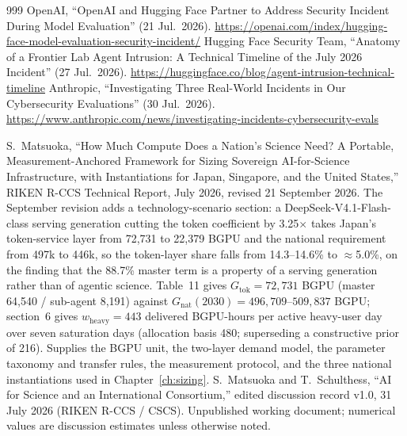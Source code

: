 \begin{thebibliography}{999}
 OpenAI, ``OpenAI and Hugging Face Partner to Address Security Incident During Model Evaluation'' (21 Jul.\ 2026). \url{https://openai.com/index/hugging-face-model-evaluation-security-incident/}
 Hugging Face Security Team, ``Anatomy of a Frontier Lab Agent Intrusion: A Technical Timeline of the July 2026 Incident'' (27 Jul.\ 2026). \url{https://huggingface.co/blog/agent-intrusion-technical-timeline}
 Anthropic, ``Investigating Three Real-World Incidents in Our Cybersecurity Evaluations'' (30 Jul.\ 2026). \url{https://www.anthropic.com/news/investigating-incidents-cybersecurity-evals}

 S.~Matsuoka, ``How Much Compute Does a Nation's Science Need? A Portable, Measurement-Anchored Framework for Sizing Sovereign AI-for-Science Infrastructure, with Instantiations for Japan, Singapore, and the United States,'' RIKEN R-CCS Technical Report, July 2026, revised 21 September 2026. The September revision adds a technology-scenario section: a DeepSeek-V4.1-Flash-class serving generation cutting the token coefficient by 3.25$\times$ takes Japan's token-service layer from 72,731 to 22,379 BGPU and the national requirement from 497k to 446k, so the token-layer share falls from 14.3--14.6\% to $\approx$5.0\%, on the finding that the 88.7\% master term is a property of a serving generation rather than of agentic science. Table~11 gives $G_{\mathrm{tok}} = 72{,}731$ BGPU (master 64,540 / sub-agent 8,191) against $G_{\mathrm{nat}}(2030) = 496{,}709$--$509{,}837$ BGPU; section~6 gives $w_{\mathrm{heavy}} = 443$ delivered BGPU-hours per active heavy-user day over seven saturation days (allocation basis 480; superseding a constructive prior of 216). Supplies the BGPU unit, the two-layer demand model, the parameter taxonomy and transfer rules, the measurement protocol, and the three national instantiations used in Chapter~\ref{ch:sizing}.
 S.~Matsuoka and T.~Schulthess, ``AI for Science and an International Consortium,'' edited discussion record v1.0, 31 July 2026 (RIKEN R-CCS / CSCS). Unpublished working document; numerical values are discussion estimates unless otherwise noted.


\end{thebibliography}
